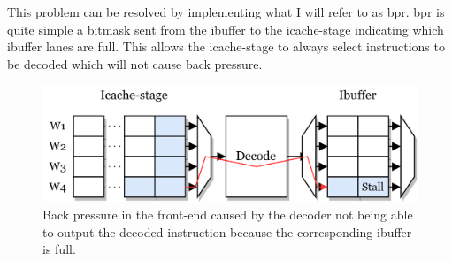 This problem can be resolved by implementing what I will refer to as \acrfull{bpr}. \acrshort{bpr} is quite simple a bitmask sent from the ibuffer to the icache-stage indicating which ibuffer lanes are full. This allows the icache-stage to always select instructions to be decoded which will not cause back pressure.

\begin{figure}
    \centering
    \includegraphics[width=\textwidth]{figures/backpressure.png}
    \caption[Illustration of back pressure from the ibuffer to the icache-stage.]{Back pressure in the front-end caused by the decoder not being able to output the decoded instruction because the corresponding ibuffer is full.}
    \label{fig:backpressure}
\end{figure}




